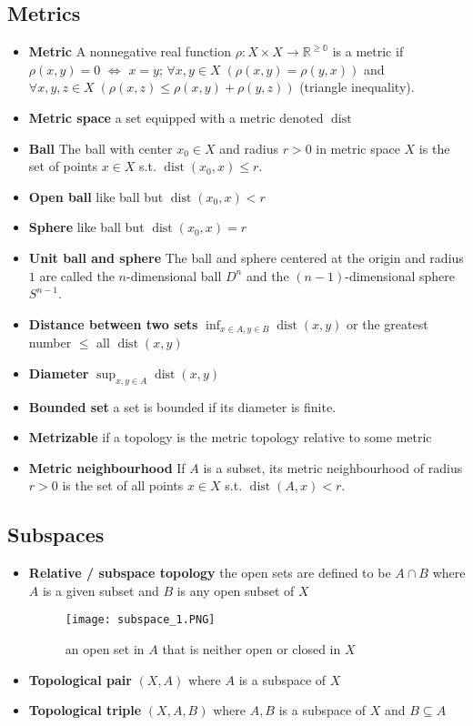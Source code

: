 \documentclass{article}
\DeclareMathOperator{\dist}{dist}
\begin{document}
\subsection{Metrics}
\begin{itemize}
\item \textbf{Metric} A nonnegative real function \(\rho: X\times X\to \mathbb{R^{\ge {0}}}\) is a metric if \(\rho(x,y)=0\) \(\Longleftrightarrow\) \(x=y\); \(\forall x,y\in X\;(\rho(x,y)=\rho(y,x))\) and \(\forall x,y,z\in X\;(\rho(x,z)\le\rho(x,y)+\rho(y,z))\) (triangle inequality).
\item \textbf{Metric space} a set equipped with a metric denoted \(\dist\)
\item \textbf{Ball} The ball with center \(x_{0}\in X\) and radius \(r>0\) in metric space \(X\) is the set of points \(x\in X\) s.t. \(\dist(x_{0},x)\le r\).
\item \textbf{Open ball} like ball but \(\dist(x_{0},x)<r\)
\item \textbf{Sphere} like ball but \(\dist(x_{0},x)=r\)
\item \textbf{Unit ball and sphere} The ball and sphere centered at the origin and radius \(1\) are called the \(n\)-dimensional ball \(D^{n}\) and the \((n-1)\)-dimensional sphere \(S^{n-1}\).
\item \textbf{Distance between two sets} \(\inf_{x\in A,y\in B}\dist(x,y)\) or the greatest number \(\le\) all \(\dist(x,y)\)
\item \textbf{Diameter} \(\sup_{x,y\in A}\dist(x,y)\)
\item \textbf{Bounded set} a set is bounded if its diameter is finite.
\item \textbf{Metrizable} if a topology is the metric topology relative to some metric
\item \textbf{Metric neighbourhood} If \(A\) is a subset, its metric neighbourhood of radius \(r>0\) is the set of all points \(x\in X\) s.t. \(\dist(A,x)< r\).
\end{itemize}
\subsection{Subspaces}
\begin{itemize}
\item \textbf{Relative / subspace topology} the open sets are defined to be \(A\cap B\) where \(A\) is a given subset and \(B\) is any open subset of \(X\)
\begin{figure}
    \centering
    \texttt{[image: subspace\_1.PNG]}
    \caption{an open set in \(A\) that is neither open or closed in \(X\)}
\end{figure}
\item \textbf{Topological pair} \((X,A)\) where \(A\) is a subspace of \(X\)
\item \textbf{Topological triple} \((X,A,B)\) where \(A,B\) is a subspace of \(X\) and \(B\subseteq A\)
\end{itemize}
\end{document}
